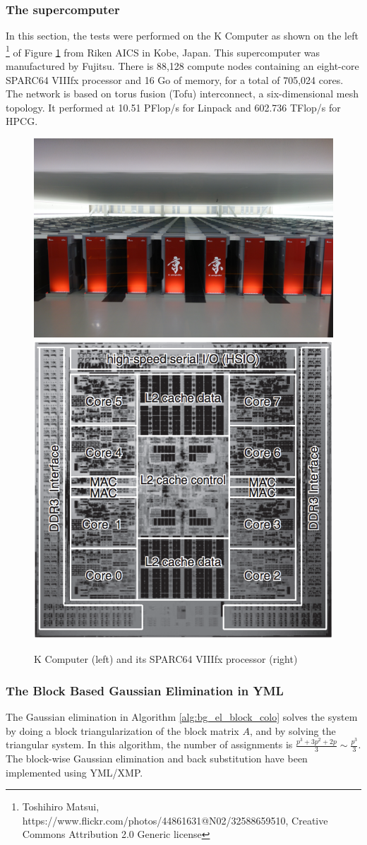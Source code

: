 \subsubsection{The supercomputer}
In this section, the tests were performed on the K Computer as shown on the left \footnote{Toshihiro Matsui, https://www.flickr.com/photos/44861631@N02/32588659510,  Creative Commons Attribution 2.0 Generic license} of Figure \ref{fig:Kcomputer} from Riken AICS in Kobe, Japan.
This supercomputer was manufactured by Fujitsu.
There is 88,128 compute nodes containing an eight-core SPARC64 VIIIfx processor and 16 Go of memory, for a total of 705,024 cores.
The network is based on torus fusion (Tofu) interconnect, a six-dimensional mesh topology.
It performed at 10.51 PFlop/s for Linpack and 602.736 TFlop/s for HPCG.

\begin{figure}[h]
	\centering
	\includegraphics[width=.5\textwidth]{k_computer}
	\includegraphics[width=.3\textwidth]{k_proc}
	\caption{K Computer (left) and its SPARC64 VIIIfx processor (right) \cite{ToMRG2012} \label{fig:Kcomputer}}
\end{figure}

\subsubsection{The Block Based Gaussian Elimination in YML}
The Gaussian elimination in Algorithm \ref{alg:bg_el_block_colo} solves the system by doing a block triangularization of the block matrix $A$, and by solving the triangular system.
In this algorithm, the number of assignments is $\frac{p^3+3p^2+2p}{3} \sim \frac{p^3}{3}$.
The block-wise Gaussian elimination and back substitution have been implemented using YML/XMP.


